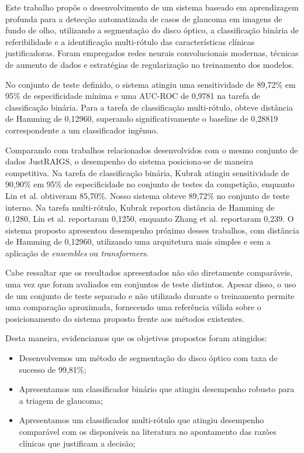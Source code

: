 \documentclass[12pt]{article}
\begin{document}
Este trabalho propôs o desenvolvimento de um sistema baseado em aprendizagem profunda para a detecção automatizada de casos de glaucoma em imagens de fundo de olho, utilizando a segmentação do disco óptico, a classificação binária de referibilidade e a identificação multi-rótulo das características clínicas justificadoras. Foram empregados redes neurais convolucionais modernas, técnicas de aumento de dados e estratégias de regularização no treinamento dos modelos.

No conjunto de teste definido, o sistema atingiu uma sensitividade de 89,72\% em 95\% de especificidade mínima e uma AUC-ROC de 0,9781 na tarefa de classificação binária. Para a tarefa de classificação multi-rótulo, obteve distância de Hamming de 0,12960, superando significativamente o baseline de 0,28819 correspondente a um classificador ingênuo.

Comparando com trabalhos relacionados desenvolvidos com o mesmo conjunto de dados JustRAIGS, o desempenho do sistema posiciona-se de maneira competitiva.  
Na tarefa de classificação binária, Kubrak \cite{justraigs_kubrak} atingiu sensitividade de 90,90\% em 95\% de especificidade no conjunto de testes da competição, enquanto Lin et al. \cite{justraigs_hu_lin} obtiveram 85,70\%. Nosso sistema obteve 89,72\% no conjunto de teste interno.
Na tarefa multi-rótulo, Kubrak reportou distância de Hamming de 0,1280, Lin et al. \cite{justraigs_hu_lin} reportaram 0,1250, enquanto Zhang et al. \cite{justraigs_zhang} reportaram 0,239. O sistema proposto apresentou desempenho próximo desses trabalhos, com distância de Hamming de 0,12960, utilizando uma arquitetura mais simples e sem a aplicação de \emph{ensembles} ou \emph{transformers}.

Cabe ressaltar que os resultados apresentados não são diretamente comparáveis, uma vez que foram avaliados em conjuntos de teste distintos. Apesar disso, o uso de um conjunto de teste separado e não utilizado durante o treinamento permite uma comparação aproximada, fornecendo uma referência válida sobre o posicionamento do sistema proposto frente aos métodos existentes.

Desta maneira, evidenciamos que os objetivos propostos foram atingidos:
\begin{itemize}[noitemsep]
    \item Desenvolvemos um método de segmentação do disco óptico com taxa de sucesso de 99,81\%;
    \item Apresentamos um classificador binário que atingiu desempenho robusto para a triagem de glaucoma;
    \item Apresentamos um classificador multi-rótulo que atingiu desempenho comparável com os disponíveis na literatura no apontamento das razões clínicas que justificam a decisão;
\end{itemize}
\end{document}
